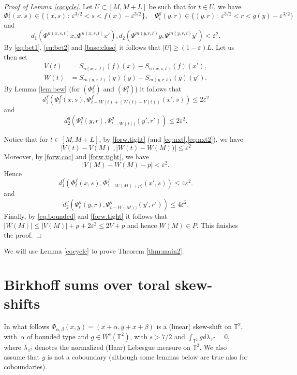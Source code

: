 \documentclass[10pt]{amsart}
\let\epsilon\varepsilon
\newcommand{\sep}{\,:\,}
\theoremstyle{definition}
\theoremstyle{plain}
\newcommand\TT{\mathbb{T}}
\begin{document}
\begin{proof}[Proof of Lemma \ref{cocycle}]
Let $U\subset [M,M+L]$ be such that for $t\in U$, we have
\[
\Phi_t^f(x,s)\in \{(x,s)\sep\epsilon^{3/2}\!<\!s\!<\!f(x)-\epsilon^{3/2}\}, \quad\Psi_t^g(y,r)\in \{(y,r)\sep\epsilon^{3/2}\!<\!r\!<\!g(y)-\epsilon^{3/2}\}
\]
and
\begin{equation*}%
d_1(\Phi^{n(x,s,t)}x,\Phi^{n(x,s,t)}x'),
d_2(\Psi^{m(y,r,t)}y,\Psi^{m(y,r,t)} y')<\epsilon^2.
\end{equation*}
By \eqref{eq:bet1}, \eqref{eq:bet2} and \eqref{base:close} it follows that $|U|\geq (1-\epsilon)L$. Let us then set
\[
\begin{aligned}
V(t)&=S_{n(x,s,t)}(f)(x)-S_{n(x,s,t)}(f)(x'),\\ W(t)&=S_{m(y,r,t)}(g)(y)-S_{m(y,r,t)}(g)(y').
\end{aligned}
\]
By Lemma \ref{lem:bew} (for $(\Phi_t^f)$ and $(\Psi_t^g)$) it follows that
\[
d_1^f(\Phi_t^f(x,s),\Phi_{t-W(t)+(W(t)-V(t))}^f(x',s))\leq 2\epsilon^2
\]
and
\[
d_2^g(\Psi_t^g(y,r),\Psi_{t-W(t))}^g(y',r'))\leq 2\epsilon^2.
\]

Notice that for $t\in [M,M+L]$, by \eqref{forw.tight} (and \eqref{eq:nxt},\eqref{eq:nxt2}), we have
\begin{equation*}%
|V(t)-V(M)|,|W(t)-W(M))|\leq \epsilon^2
\end{equation*}
Moreover, by \eqref{forw.coc} and \eqref{forw.tight}, we have
\begin{equation*}%
|V(M)-W(M)-p|<\epsilon^2.
\end{equation*}
Hence
\[
d_1^f(\Phi_t^f(x,s),\Phi_{t-W(M)+p)}^f(x',s))\leq 4\epsilon^2.
\]
and
\[
d_2^g(\Psi_t^g(y,r),\Psi_{t-W(M))}^g(y',r'))\leq 4\epsilon^2.
\]
Finally, by \eqref{eq.bounded} and \eqref{forw.tight} it follows that $|W(M)|\leq
|V(M)|+p+2\epsilon^2\leq 2V+p$ and hence $W(M)\in P$. This finishes the proof.
\end{proof}

We will use Lemma \ref{cocycle} to prove Theorem \ref{thm:main2}.

\section{Birkhoff sums over toral skew-shifts}\label{sec:birksums}
In what follows $\Phi_{\alpha,\beta}(x,y)=(x+\alpha, y+x+\beta)$ is a (linear) skew-shift on $\TT^2$, with~$\alpha$ of bounded type and $g\in W^s(\TT^2)$, with $s>7/2$ and
$\int_{\TT^2} g d \lambda_{\TT^2} =0$, where $\lambda_{\TT^2}$ denotes the normalized (Haar) Lebesgue measure on $\TT^2$. We also assume that $g$ is not a coboundary (although some lemmas below are true also for coboundaries).
\end{document}
